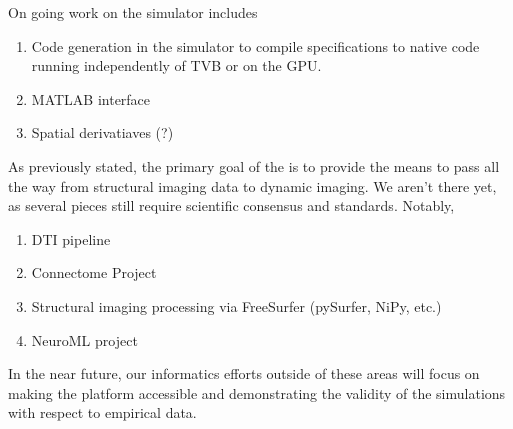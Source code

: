 
On going work on the simulator includes

\begin{enumerate}
	\item Code generation in the simulator to compile specifications to native
		code running independently of TVB or on the GPU.
	\item MATLAB interface
	\item Spatial derivatiaves (?) 
\end{enumerate}

As previously stated, the primary goal of the \TVB is to provide the means
to pass all the way from structural imaging data to dynamic imaging. We
aren't there yet, as several pieces still require scientific consensus 
and standards. Notably, 

\begin{enumerate}
	\item DTI pipeline
	\item Connectome Project
	\item Structural imaging processing via FreeSurfer (pySurfer, NiPy, etc.)
	\item NeuroML project	
\end{enumerate}


In the near future, our informatics efforts outside of these areas will
focus on making the platform accessible and demonstrating the validity
of the simulations with respect to empirical data.

